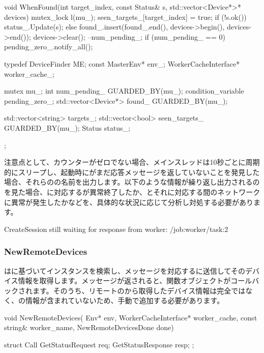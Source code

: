 \begin{content}
\begin{leftbar}
\begin{c++}
{  void WhenFound(int target_index, const Status& s,
                 std::vector<Device*>* devices) {
    mutex_lock l(mu_);
    seen_targets_[target_index] = true;
    if (!s.ok()) {
      status_.Update(s);
    } else {
      found_.insert(found_.end(), devices->begin(), devices->end());
      devices->clear();
    }
    --num_pending_;
    if (num_pending_ == 0) {
      pending_zero_.notify_all();
    }
  }

  typedef DeviceFinder ME;
  const MasterEnv* env_;
  WorkerCacheInterface* worker_cache_;

  mutex mu_;
  int num_pending_ GUARDED_BY(mu_);
  condition_variable pending_zero_;
  std::vector<Device*> found_ GUARDED_BY(mu_);

  std::vector<string> targets_;
  std::vector<bool> seen_targets_ GUARDED_BY(mu_);
  Status status_;
};
\end{c++}
\end{leftbar}

注意点として、カウンターがゼロでない場合、メインスレッドは10秒ごとに周期的にスリープし、起動時にがまだ応答メッセージを返していないことを発見した場合、それらのの名前を出力します。以下のような情報が繰り返し出力されるのを見た場合、に対応するが異常終了したか、とそれに対応する間のネットワークに異常が発生したかなどを、具体的な状況に応じて分析し対処する必要があります。

\begin{leftbar}
\begin{python}
CreateSession still waiting for response from worker: /job:worker/task:2
\end{python}
\end{leftbar}

\subsubsection{NewRemoteDevices}

はに基づいてインスタンスを検索し、メッセージを対応するに送信してそのデバイス情報を取得します。メッセージが返されると、関数オブジェクトがコールバックされます。そのうち、リモートのから取得したデバイス情報は完全ではなく、の情報が含まれていないため、手動で追加する必要があります。

\begin{leftbar}
\begin{c++}
void NewRemoteDevices(
    Env* env, WorkerCacheInterface* worker_cache,
    const string& worker_name, NewRemoteDevicesDone done) {
  struct Call {
    GetStatusRequest req;
    GetStatusResponse resp;
  };

}
\end{c++}
\end{leftbar}
\end{content}

